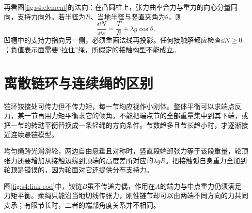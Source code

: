 再看图\ref{fig:s4:element}的法向：在凸圆柱上，张力曲率合力与重力的向心分量同向，支持力向外。若半径为$R$、当地半径与竖直夹角为$\theta$，则
\[
\frac{\dd N}{\dd s}=\frac TR+\lambda g\cos\theta.
\]
凹槽中的支持力指向另一侧，必须重画法线再投影。任何接触解都应检查$\dd N\ge0$；负值表示面需要“拉住”绳，所假定的接触构型不能成立。

\section{离散链环与连续绳的区别}
链环铰接处可传力但不传力矩，每一节均应视作小刚体。整体平衡可以求端点反力，某一节再用力矩平衡求它的倾角。不能把端点节的全部重量集中到其下端，或把一节的转动平衡替换成一条轻绳的方向条件。节数趋多且节长趋小时，才逐渐接近连续悬链模型。

均匀绳跨光滑滑轮，两边自由悬垂且对称时，竖直段端部张力等于该段重量，轮顶张力还要增加从接触边缘到顶端的高度差所对应的$\lambda gR$。把接触弧自身重力全加到轮顶是错误的，因为轮面对它还提供分布支持力。

图\ref{fig:s4:link-rod}中，铰链$B$虽不传递力偶，作用在$A$的端力与中点重力仍须满足力矩平衡。柔绳只能沿当地切线传张力，刚性链节却可以由两端不同方向的力共同支承；有限节长时，二者的端部角度关系并不相同。


